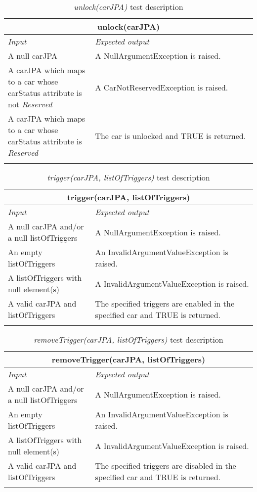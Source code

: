 \begin{longtable}{p{0.35\linewidth}p{0.65\linewidth}}
\multicolumn{2}{c}{\textbf{unlock(carJPA)}} \\
\toprule
\emph{Input} & \emph{Expected output} \\
\midrule
A null carJPA & A NullArgumentException is raised.\\
\midrule
A carJPA which maps to a car whose carStatus attribute is not \emph{Reserved} & A CarNotReservedException is raised. \\
\midrule
A carJPA which maps to a car whose carStatus attribute is \emph{Reserved} & The car is unlocked and TRUE is returned.\\
\bottomrule
\caption{\emph{unlock(carJPA)} test description}
\end{longtable}


\begin{longtable}{p{0.35\linewidth}p{0.65\linewidth}}
\multicolumn{2}{c}{\textbf{trigger(carJPA, listOfTriggers)}} \\
\toprule
\emph{Input} & \emph{Expected output} \\
\midrule
A null carJPA and/or a null listOfTriggers & A NullArgumentException is raised.\\
\midrule
An empty listOfTriggers & An InvalidArgumentValueException is raised. \\
\midrule
A listOfTriggers with null element(s) & A InvalidArgumentValueException is raised.\\
\midrule
A valid carJPA and listOfTriggers & The specified triggers are enabled in the specified car and TRUE is returned. \\
\bottomrule
\caption{\emph{trigger(carJPA, listOfTriggers)} test description}
\end{longtable}


\begin{longtable}{p{0.35\linewidth}p{0.65\linewidth}}
\multicolumn{2}{c}{\textbf{removeTrigger(carJPA, listOfTriggers)}} \\
\toprule
\emph{Input} & \emph{Expected output} \\
\midrule
A null carJPA and/or a null listOfTriggers & A NullArgumentException is raised.\\
\midrule
An empty listOfTriggers & An InvalidArgumentValueException is raised. \\
\midrule
A listOfTriggers with null element(s) & A InvalidArgumentValueException is raised.\\
\midrule
A valid carJPA and listOfTriggers & The specified triggers are disabled in the specified car and TRUE is returned. \\
\bottomrule
\caption{\emph{removeTrigger(carJPA, listOfTriggers)} test description}
\end{longtable}

